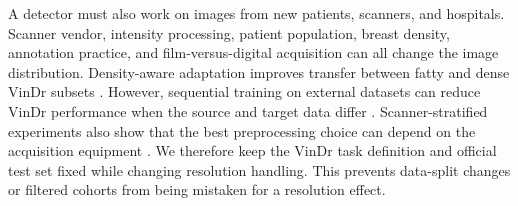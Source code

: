 A detector must also work on images from new patients, scanners, and hospitals.
Scanner vendor, intensity processing, patient population, breast density,
annotation practice, and film-versus-digital acquisition can all change the
image distribution. Density-aware adaptation improves transfer between fatty
and dense VinDr subsets \cite{nguyen2023crossdensity}. However, sequential
training on external datasets can reduce VinDr performance when the source and
target data differ \cite{abdikenov2025transfer}. Scanner-stratified experiments
also show that the best preprocessing choice can depend on the acquisition
equipment \cite{ferreira2026preprocessing}. We therefore keep the VinDr task
definition and official test set fixed while changing resolution handling.
This prevents data-split changes or filtered cohorts from being mistaken for a
resolution effect.
